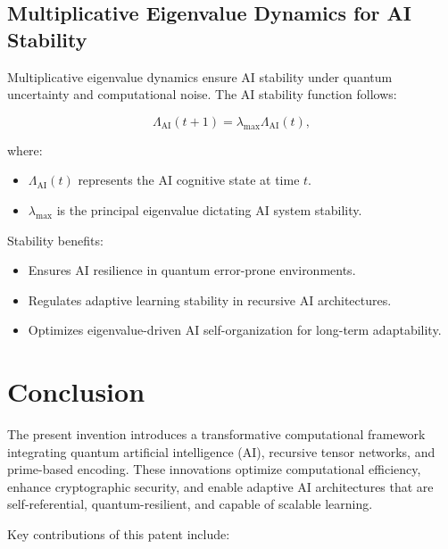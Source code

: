 \documentclass{article}
\theoremstyle{plain}
\begin{document}
\subsection{Multiplicative Eigenvalue Dynamics for AI Stability}

Multiplicative eigenvalue dynamics ensure AI stability under quantum uncertainty and computational noise. The AI stability function follows:

\begin{equation}
\Lambda_{\text{AI}}(t+1) = \lambda_{\text{max}} \Lambda_{\text{AI}}(t),
\end{equation}

where:
\begin{itemize}
    \item $\Lambda_{\text{AI}}(t)$ represents the AI cognitive state at time $t$.
    \item $\lambda_{\text{max}}$ is the principal eigenvalue dictating AI system stability.
\end{itemize}

Stability benefits:
\begin{itemize}
    \item Ensures AI resilience in quantum error-prone environments.
    \item Regulates adaptive learning stability in recursive AI architectures.
    \item Optimizes eigenvalue-driven AI self-organization for long-term adaptability.
\end{itemize}

\section{Conclusion}

The present invention introduces a transformative computational framework integrating quantum artificial intelligence (AI), recursive tensor networks, and prime-based encoding. These innovations optimize computational efficiency, enhance cryptographic security, and enable adaptive AI architectures that are self-referential, quantum-resilient, and capable of scalable learning.

Key contributions of this patent include:
\end{document}

